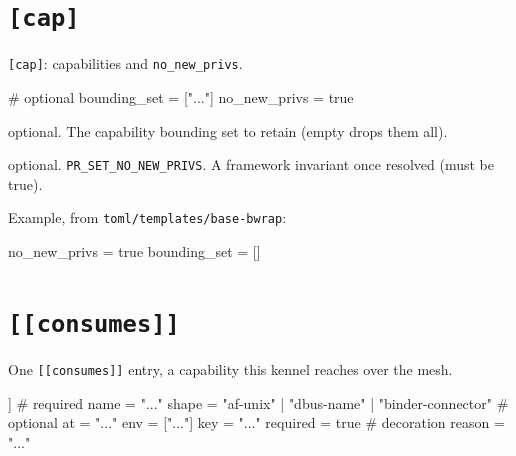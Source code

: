 \hypertarget{cap}{%
\section{\texorpdfstring{\texttt{{[}cap{]}}}{{[}cap{]}}}\label{cap}}

\texttt{{[}cap{]}}: capabilities and \texttt{no\_new\_privs}.

\begin{kennelcode}
[cap]
# optional
bounding_set = ["..."]
no_new_privs = true
\end{kennelcode}

\begin{description}
\tightlist
\item[\texttt{bounding\_set}]
optional. The capability bounding set to retain (empty drops them all).
\item[\texttt{no\_new\_privs}]
optional. \texttt{PR\_SET\_NO\_NEW\_PRIVS}. A framework invariant once
resolved (must be true).
\end{description}

Example, from \texttt{toml/templates/base-bwrap}:

\begin{kennelcode}
[cap]
no_new_privs = true
bounding_set = []
\end{kennelcode}

\hypertarget{consumes}{%
\section{\texorpdfstring{\texttt{{[}{[}consumes{]}{]}}}{{[}{[}consumes{]}{]}}}\label{consumes}}

One \texttt{{[}{[}consumes{]}{]}} entry, a capability this kennel
reaches over the mesh.

\begin{kennelcode}
[[consumes]]
# required
name     = "..."
shape    = "af-unix" | "dbus-name" | "binder-connector"
# optional
at       = "..."
env      = ["..."]
key      = "..."
required = true
# decoration
reason   = "..."
\end{kennelcode}

